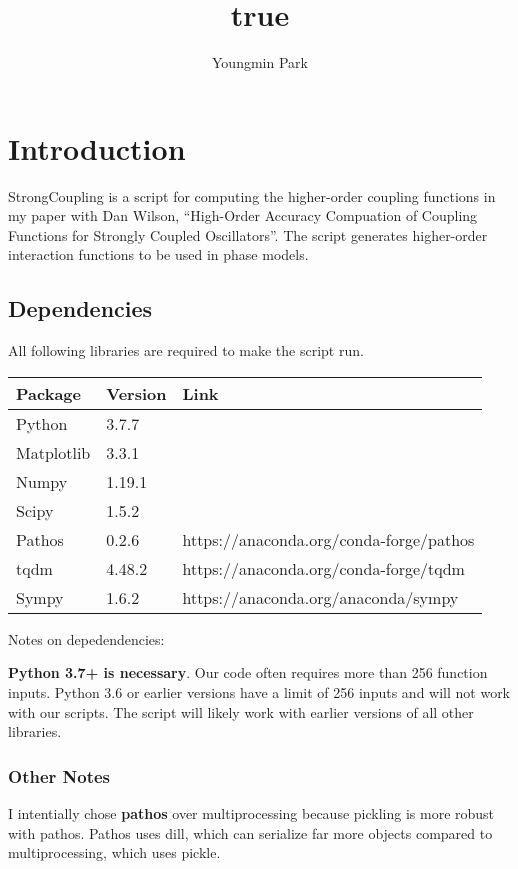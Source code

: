 \documentclass[english,a4paper,oneside]{article}
\title{true}
\author{Youngmin Park}
\date{}
\begin{document}
\maketitle

{
\hypersetup{linkcolor=black}
\setcounter{tocdepth}{4}
\tableofcontents
}
\section{Introduction}\label{introduction}

StrongCoupling is a script for computing the higher-order coupling
functions in my paper with Dan Wilson, ``High-Order Accuracy Compuation
of Coupling Functions for Strongly Coupled Oscillators''. The script
generates higher-order interaction functions to be used in phase models.

\subsection{Dependencies}\label{dependencies}

All following libraries are required to make the script run.

\begin{longtable}[]{@{}lll@{}}
\toprule
Package & Version & Link\tabularnewline
\midrule
\endhead
Python & 3.7.7 &\tabularnewline
Matplotlib & 3.3.1 &\tabularnewline
Numpy & 1.19.1 &\tabularnewline
Scipy & 1.5.2 &\tabularnewline
Pathos & 0.2.6 & https://anaconda.org/conda-forge/pathos\tabularnewline
tqdm & 4.48.2 & https://anaconda.org/conda-forge/tqdm\tabularnewline
Sympy & 1.6.2 & https://anaconda.org/anaconda/sympy\tabularnewline
\bottomrule
\end{longtable}

Notes on depedendencies:

\textbf{Python 3.7+ is necessary}. Our code often requires more than 256
function inputs. Python 3.6 or earlier versions have a limit of 256
inputs and will not work with our scripts. The script will likely work
with earlier versions of all other libraries.

\subsubsection{Other Notes}\label{other-notes}

I intentially chose \textbf{pathos} over multiprocessing because
pickling is more robust with pathos. Pathos uses dill, which can
serialize far more objects compared to multiprocessing, which uses
pickle.
\end{document}
